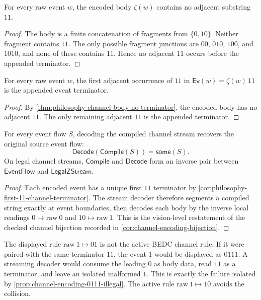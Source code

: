 \begin{theorem}
\label{thm:philosophy-channel-body-no-terminator}
For every raw event $w$, the encoded body $\zeta(w)$ contains no
adjacent substring $11$.
\end{theorem}
\begin{proof}
The body is a finite concatenation of fragments from $\{0,10\}$. Neither
fragment contains $11$. The only possible fragment junctions are
$00$, $010$, $100$, and $1010$, and none of these contains $11$. Hence
no adjacent $11$ occurs before the appended terminator.
\end{proof}

\begin{corollary}
\label{cor:philosophy-first-11-channel-terminator}
For every raw event $w$, the first adjacent occurrence of $11$ in
$\mathsf{Ev}(w)=\zeta(w)\,11$ is the appended event terminator.
\end{corollary}
\begin{proof}
By \autoref{thm:philosophy-channel-body-no-terminator}, the encoded body
has no adjacent $11$. The only remaining adjacent $11$ is the appended
terminator.
\end{proof}

\begin{theorem}
\label{thm:philosophy-channel-round-trip}
For every event flow $S$, decoding the compiled channel stream recovers
the original source event flow:
$$
  \mathsf{Decode}(\mathsf{Compile}(S))=\mathsf{some}(S).
$$
On legal channel streams, $\mathsf{Compile}$ and $\mathsf{Decode}$ form
an inverse pair between $\mathsf{EventFlow}$ and
$\mathsf{LegalZStream}$.
\end{theorem}
\begin{proof}
Each encoded event has a unique first $11$ terminator by
\autoref{cor:philosophy-first-11-channel-terminator}. The stream decoder
therefore segments a compiled string exactly at event boundaries, then
decodes each body by the inverse local readings $0\mapsto\mathrm{raw}\ 0$
and $10\mapsto\mathrm{raw}\ 1$. This is the vision-level restatement of
the checked channel bijection recorded in
\autoref{cor:channel-encoding-bijection}.
\end{proof}

\begin{remark}
\label{rem:philosophy-rejected-channel-rule}
The displayed rule $\mathrm{raw}\ 1\mapsto 01$ is not the active BEDC
channel rule. If it were paired with the same terminator $11$, the event
$1$ would be displayed as $0111$. A streaming decoder would consume the
leading $0$ as body data, read $11$ as a terminator, and leave an
isolated malformed $1$. This is exactly the failure isolated by
\autoref{prop:channel-encoding-0111-illegal}. The active rule
$\mathrm{raw}\ 1\mapsto 10$ avoids the collision.
\end{remark}

